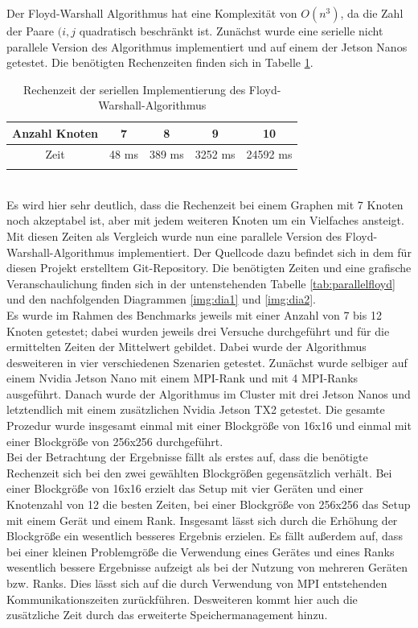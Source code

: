 \documentclass[doktyp=semarbeit, sprache=german]{TUBAFarbeiten}
\begin{document}
Der Floyd-Warshall Algorithmus hat eine Komplexität von $O(n^3)$, da die Zahl der Paare $(i,j$ quadratisch beschränkt ist.
Zunächst wurde eine serielle nicht parallele Version des Algorithmus implementiert und auf einem der Jetson Nanos getestet. Die benötigten Rechenzeiten finden sich in Tabelle \ref{tab:seriell}.
\begin{table}[]
\centering
\begin{tabular}{@{}ccccc@{}}
\multicolumn{1}{c|}{Anzahl Knoten} & 7     & 8      & 9       & 10       \\ \midrule
\multicolumn{1}{c|}{Zeit}          & 48 ms & 389 ms & 3252 ms & 24592 ms \\
\multicolumn{5}{c}{}                                                    
\end{tabular}
\caption{Rechenzeit der seriellen Implementierung des Floyd-Warshall-Algorithmus}
\label{tab:seriell}
\end{table}
\\Es wird hier sehr deutlich, dass die Rechenzeit bei einem Graphen mit 7 Knoten noch akzeptabel ist, aber mit jedem weiteren Knoten um ein Vielfaches ansteigt. Mit diesen Zeiten als Vergleich wurde nun eine parallele Version des Floyd-Warshall-Algorithmus implementiert. Der Quellcode dazu befindet sich in dem für diesen Projekt erstelltem Git-Repository. Die benötigten Zeiten und eine grafische Veranschaulichung finden sich in der untenstehenden Tabelle \ref{tab:parallelfloyd} und den nachfolgenden Diagrammen \ref{img:dia1} und \ref{img:dia2}. 
\\Es wurde im Rahmen des Benchmarks jeweils mit einer Anzahl von 7 bis 12 Knoten getestet; dabei wurden jeweils drei Versuche durchgeführt und für die ermittelten Zeiten der Mittelwert gebildet. Dabei wurde der Algorithmus desweiteren in vier verschiedenen Szenarien getestet. Zunächst wurde selbiger auf einem Nvidia Jetson Nano mit einem MPI-Rank und mit 4 MPI-Ranks ausgeführt. Danach wurde der Algorithmus im Cluster mit drei Jetson Nanos und letztendlich mit einem zusätzlichen Nvidia Jetson TX2 getestet. Die gesamte Prozedur wurde insgesamt einmal mit einer Blockgröße von 16x16 und einmal mit einer Blockgröße von 256x256 durchgeführt. 
\\Bei der Betrachtung der Ergebnisse fällt als erstes auf, dass die benötigte Rechenzeit sich bei den zwei gewählten Blockgrößen gegensätzlich verhält. Bei einer Blockgröße von 16x16 erzielt das Setup mit vier Geräten und einer Knotenzahl von 12 die besten Zeiten, bei einer Blockgröße von 256x256 das Setup mit einem Gerät und einem Rank. Insgesamt lässt sich durch die Erhöhung der Blockgröße ein wesentlich besseres Ergebnis erzielen. Es fällt außerdem auf, dass bei einer kleinen Problemgröße die Verwendung eines Gerätes und eines Ranks wesentlich bessere Ergebnisse aufzeigt als bei der Nutzung von mehreren Geräten bzw. Ranks. Dies lässt sich auf die durch Verwendung von MPI entstehenden Kommunikationszeiten zurückführen. Desweiteren kommt hier auch die zusätzliche Zeit durch das erweiterte Speichermanagement hinzu.
\end{document}
